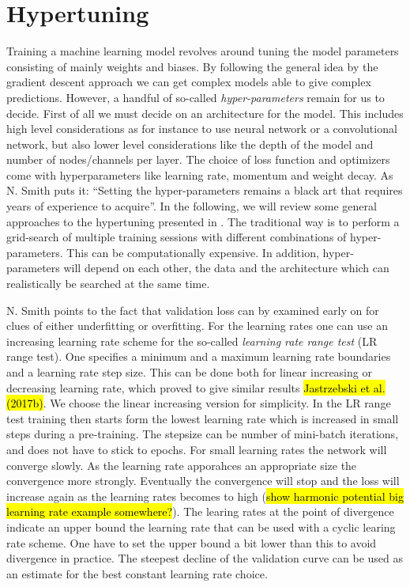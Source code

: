 \section{Hypertuning}
Training a machine learning model revolves around tuning the model parameters
consisting of mainly weights and biases. By following the general idea by the
gradient descent approach we can get complex models able to give complex
predictions. However, a handful of so-called \textit{hyper-parameters} remain
for us to decide. First of all we must decide on an architecture for the model.
This includes high level considerations as for instance to use neural network or
a convolutional network, but also lower level considerations like the depth of
the model and number of nodes/channels per layer. The choice of loss function
and optimizers come with hyperparameters like learning rate, momentum and weight
decay. As N. Smith \cite{smith2018disciplined} puts it: ``Setting the
hyper-parameters remains a black art that requires years of experience to
acquire''. In the following, we will review some general approaches to the
hypertuning presented in \cite{smith2018disciplined}. The traditional way is to
perform a grid-search of multiple training sessions with different combinations
of hyper-parameters. This can be computationally expensive. In addition, hyper-parameters will depend on each other, the data and the architecture which can realistically be searched at the same time. 

N. Smith points to the fact that validation loss can by examined early on for
clues of either underfitting or overfitting. For the learning rates one can use
an increasing learning rate scheme for the so-called \textit{learning rate range
test} (LR range test). One specifies a minimum and a maximum learning rate
boundaries and a learning rate step size.  This can be done both for linear
increasing or decreasing learning rate, which proved to give similar results
\cite{smith2018disciplined} \hl{Jastrzebski et al. (2017b)}. We choose the
linear increasing version for simplicity. In the LR range test training then
starts form the lowest learning rate which is increased in small steps during a
pre-training. The stepsize can be number of mini-batch iterations, and does not
have to stick to epochs. For small learning rates the network will converge
slowly. As the learning rate apporahces an appropriate size the convergence more
strongly. Eventually the convergence will stop and the loss will increase again
as the learning rates becomes to high (\hl{show harmonic potential big learning
rate example somewhere?}). The learing rates at the point of divergence indicate an upper bound the learning rate that can be used with a cyclic learing rate scheme. One have to set the upper bound a bit lower than this to avoid divergence in practice. The steepest decline of the validation curve can be used as an estimate for the best constant learning rate choice. 


